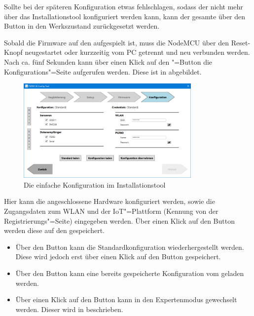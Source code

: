 \begin{mdframed}[frametitle=Hinweis]
	\begin{minipage}{\linewidth}
    	Sollte bei der späteren Konfiguration etwas fehlschlagen, sodass der \sk nicht mehr über das Installationstool konfiguriert werden kann, kann der gesamte \sk über den Button  in den Werkszustand zurückgesetzt werden.
   \end{minipage}
\end{mdframed}

Sobald die Firmware auf den \sk aufgespielt ist, muss die NodeMCU über den Reset-Knopf neugestartet oder kurzzeitig vom PC getrennt und neu verbunden werden. Nach ca. fünf Sekunden kann über einen Klick auf den "=Button die Konfigurations"=Seite aufgerufen werden.
Diese ist in  abgebildet.
\begin{figure}[!htb]
	\centering
	\includegraphics[width=0.8\textwidth]{./ressourcen/i-tool/Konfiguration_basic}
	\caption{Die einfache Konfiguration im Installationstool}
	\label{fig:skitool05}
\end{figure}
Hier kann die angeschlossene Hardware konfiguriert werden, sowie die Zugangsdaten zum WLAN und der IoT"=Plattform (Kennung von der Registrierungs"=Seite) eingegeben werden.
Über einen Klick auf den Button  werden diese auf den \sk gespeichert.

\begin{mdframed}[frametitle=Weitere Hinweise]
	\begin{minipage}{\linewidth}
	    \begin{itemize}
	        \item Über den Button  kann die Standardkonfiguration wiederhergestellt werden. Diese wird jedoch erst über einen Klick auf den Button  gespeichert.
	        \item Über den Button  kann eine bereits gespeicherte Konfiguration vom \sk geladen werden.
	        \item Über einen Klick auf den Button  kann in den Expertenmodus gewechselt werden. Dieser wird in  beschrieben.
	    \end{itemize}
	\end{minipage}
\end{mdframed}

